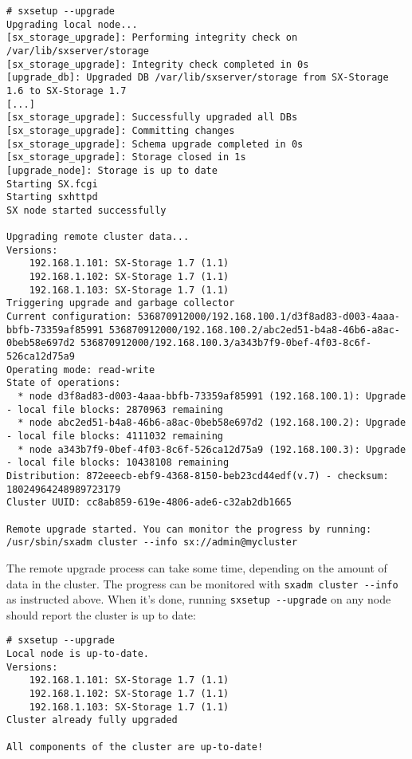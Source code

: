 \begin{lstlisting}
# sxsetup --upgrade
Upgrading local node...
[sx_storage_upgrade]: Performing integrity check on /var/lib/sxserver/storage
[sx_storage_upgrade]: Integrity check completed in 0s
[upgrade_db]: Upgraded DB /var/lib/sxserver/storage from SX-Storage 1.6 to SX-Storage 1.7
[...]
[sx_storage_upgrade]: Successfully upgraded all DBs
[sx_storage_upgrade]: Committing changes
[sx_storage_upgrade]: Schema upgrade completed in 0s
[sx_storage_upgrade]: Storage closed in 1s
[upgrade_node]: Storage is up to date
Starting SX.fcgi
Starting sxhttpd
SX node started successfully

Upgrading remote cluster data...
Versions:
    192.168.1.101: SX-Storage 1.7 (1.1)
    192.168.1.102: SX-Storage 1.7 (1.1)
    192.168.1.103: SX-Storage 1.7 (1.1)
Triggering upgrade and garbage collector
Current configuration: 536870912000/192.168.100.1/d3f8ad83-d003-4aaa-bbfb-73359af85991 536870912000/192.168.100.2/abc2ed51-b4a8-46b6-a8ac-0beb58e697d2 536870912000/192.168.100.3/a343b7f9-0bef-4f03-8c6f-526ca12d75a9
Operating mode: read-write
State of operations:
  * node d3f8ad83-d003-4aaa-bbfb-73359af85991 (192.168.100.1): Upgrade - local file blocks: 2870963 remaining
  * node abc2ed51-b4a8-46b6-a8ac-0beb58e697d2 (192.168.100.2): Upgrade - local file blocks: 4111032 remaining
  * node a343b7f9-0bef-4f03-8c6f-526ca12d75a9 (192.168.100.3): Upgrade - local file blocks: 10438108 remaining
Distribution: 872eeecb-ebf9-4368-8150-beb23cd44edf(v.7) - checksum: 18024964248989723179
Cluster UUID: cc8ab859-619e-4806-ade6-c32ab2db1665

Remote upgrade started. You can monitor the progress by running:
/usr/sbin/sxadm cluster --info sx://admin@mycluster
\end{lstlisting}
The remote upgrade process can take some time, depending on the amount of
data in the cluster. The progress can be monitored with
\verb+sxadm cluster --info+ as instructed above. When it's done, running
\verb+sxsetup --upgrade+ on any node should report the cluster is up to date:
\begin{lstlisting}
# sxsetup --upgrade
Local node is up-to-date.
Versions:
    192.168.1.101: SX-Storage 1.7 (1.1)
    192.168.1.102: SX-Storage 1.7 (1.1)
    192.168.1.103: SX-Storage 1.7 (1.1)
Cluster already fully upgraded

All components of the cluster are up-to-date!
\end{lstlisting}
